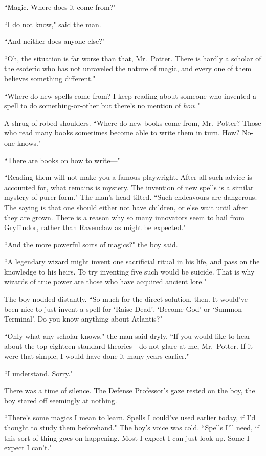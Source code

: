 ``Magic. Where does it come from?"

``I do not know," said the man.

``And neither does anyone else?"

``Oh, the situation is far worse than that, Mr.~Potter. There is hardly a scholar of the esoteric who has not unraveled the nature of magic, and every one of them believes something different."

``Where do new spells come from? I keep reading about someone who invented a spell to do something-or-other but there's no mention of \emph{how}."

A shrug of robed shoulders. ``Where do new books come from, Mr.~Potter? Those who read many books sometimes become able to write them in turn. How? No-one knows."

``There are books on how to write—"

``Reading them will not make you a famous playwright. After all such advice is accounted for, what remains is mystery. The invention of new spells is a similar mystery of purer form." The man's head tilted. ``Such endeavours are dangerous. The saying is that one should either not have children, or else wait until after they are grown. There is a reason why so many innovators seem to hail from Gryffindor, rather than Ravenclaw as might be expected."

``And the more powerful sorts of magics?" the boy said.

``A legendary wizard might invent one sacrificial ritual in his life, and pass on the knowledge to his heirs. To try inventing five such would be suicide. That is why wizards of true power are those who have acquired ancient lore."

The boy nodded distantly. ``So much for the direct solution, then. It would've been nice to just invent a spell for `Raise Dead', `Become God' or `Summon Terminal'. Do you know anything about Atlantis?"

``Only what any scholar knows," the man said dryly. ``If you would like to hear about the top eighteen standard theories—do not glare at me, Mr.~Potter. If it were that simple, I would have done it many years earlier."

``I understand. Sorry."

There was a time of silence. The Defense Professor's gaze rested on the boy, the boy stared off seemingly at nothing.

``There's some magics I mean to learn. Spells I could've used earlier today, if I'd thought to study them beforehand." The boy's voice was cold. ``Spells I'll need, if this sort of thing goes on happening. Most I expect I can just look up. Some I expect I can't."

